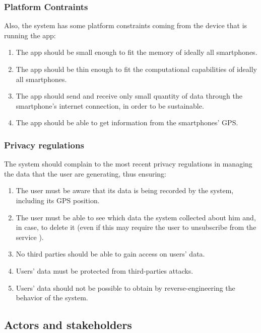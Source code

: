 \documentclass[11pt]{article} %
\begin{document}
	\subsubsection{Platform Contraints}
Also, the system has some platform constraints coming from the device that is running the app:
\begin{enumerate}
	\item The app should be small enough to fit the memory of ideally all smartphones.
	\item The app should be thin enough to fit the computational capabilities of ideally all smartphones.
	\item The app should send and receive only small quantity of data through the smartphone's internet connection, in order to be sustainable.
	\item The app should be able to get information from the smartphones' GPS.
  \end{enumerate}

	\subsubsection{Privacy regulations}
The system should complain to the most recent privacy regulations in managing the data that the user are generating, thus ensuring:
\begin{enumerate}
	\item The user must be aware that its data is being recorded by the system, including its GPS position.
	\item The user must be able to see which data the system collected about him and, in case, to delete it (even if this may require the user to unsubscribe from the service
).
	\item No third parties should be able to gain access on users' data.
	\item Users' data must be protected from third-parties attacks.
	\item Users' data should not be possible to obtain by reverse-engineering the behavior of the system.
\end{enumerate}

\subsection{Actors and stakeholders}
\end{document}
